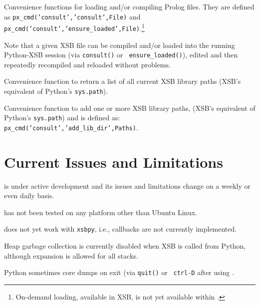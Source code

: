 \begin{description}
%
  Convenience functions for loading and/or compiling Prolog files.
  They are defined as {\tt px\_cmd('consult','consult',File)} and {\tt
    px\_cmd('consult','ensure\_loaded',File)}.\footnote{On-demand
    loading, available in XSB, is not yet available within \px{}.}

  Note that a given XSB file can be compiled and/or loaded into the
  running Python-XSB session (via {\tt consult()} or {\tt
    ensure\_loaded()}), edited and then repeatedly recompiled and
    reloaded without problems.

%  
  Convenience function to return a list of all current XSB library
  paths (XSB's equivalent of Python's {\tt sys.path}).

%  
    Convenience function to add one or more XSB library paths, (XSB's
    equivalent of Python's {\tt sys.path}) and is defined as: {\tt
      px\_cmd('consult','add\_lib\_dir',Paths)}.
  
\end{description}

\section{Current Issues and Limitations} \label{sec:px-limits}

\px{} is under active development and its issues and limitations
change on a weekly or even daily basis.

\bi
\item \px{} has not been tested on any platform other than Ubuntu
  Linux.
\item \px{} does not yet work with {\tt xsbpy}, i.e., callbacks are
  not currently implemented.
\item Heap garbage collection is currently disabled when XSB is called
  from Python, although expansion is allowed for all stacks. 
\item Python sometimes core dumps on exit (via {\tt quit()} or {\tt
  ctrl-D} after using \px.
  
\ei  
